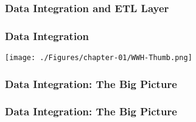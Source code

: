 \subsubsection{Data Integration and ETL Layer}

\begin{frame}
    \frametitle{Data Integration}

    \texttt{[image: ./Figures/chapter-01/WWH-Thumb.png]}

\end{frame}
\begin{frame}
    \frametitle{Data Integration: The Big Picture}

    

\end{frame}
\begin{frame}
    \frametitle{Data Integration: The Big Picture}

    

\end{frame}
